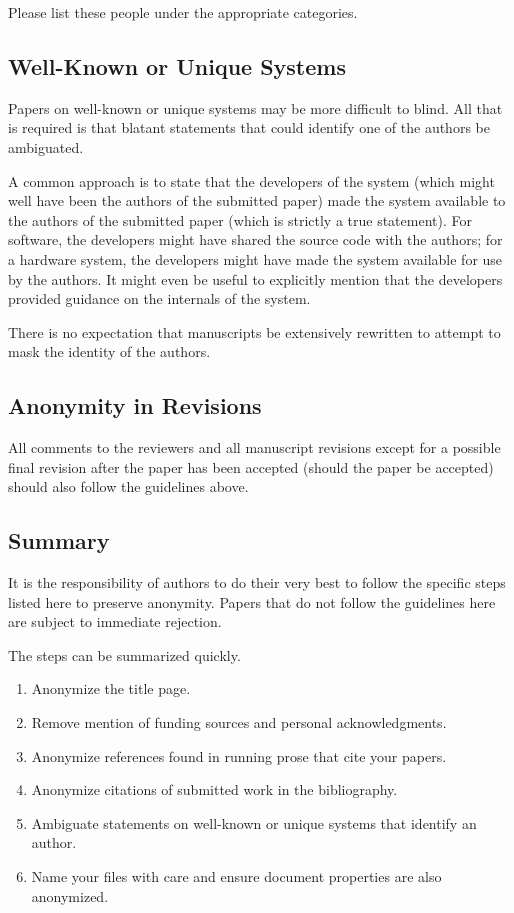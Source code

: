 \documentclass[acmtods,acmnow]{acmtrans2m}
\begin{document}
\noindent
Please list these people under the appropriate categories.

\subsection{Well-Known or Unique Systems}\label{app:sys}
Papers on well-known or unique systems may be more difficult to blind.
All that is required is that blatant statements that could identify one of
the authors be ambiguated.

A common approach is to state that the developers of the system (which might
well have been the authors of the submitted paper) made the system available
to the authors of the submitted paper (which is strictly a true
statement). For software, the developers might have shared the source code
with the authors; for a hardware system, the developers might have made the
system available for use by the authors. It might even be useful to
explicitly mention that the developers provided guidance on the
internals of the system.

There is no expectation that manuscripts be extensively rewritten to attempt
to mask the identity of the authors.

\subsection{Anonymity in Revisions}\label{app:rev}
All comments to the reviewers and all manuscript revisions except for a
possible final revision after the paper has been accepted (should the paper
be accepted) should also follow the guidelines above.

\subsection{Summary}
It is the responsibility of authors to do their very best to follow the
specific steps listed here to preserve anonymity. Papers that do not follow
the guidelines here are subject to immediate rejection.

The steps can be summarized quickly.
\begin{enumerate}
\item Anonymize the title page.
\item Remove mention of funding sources and personal acknowledgments.
\item Anonymize references found in running prose that cite your papers.
\item Anonymize citations of submitted work in the bibliography.
\item Ambiguate statements on well-known or unique systems that identify an author.
\item Name your files with care and ensure document properties are also anonymized.
\end{enumerate}
\end{document}
